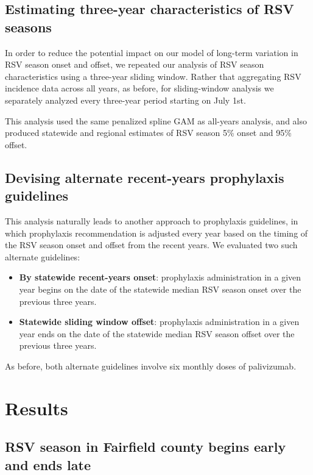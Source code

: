 \documentclass{article}\usepackage[]{graphicx}\usepackage[]{color}
\begin{document}
\begin{multicols}{2}
\subsection{Estimating three-year characteristics of RSV seasons}

In order to reduce the potential impact on our model of long-term variation in RSV season onset and offset, we repeated our analysis of RSV season characteristics using a three-year sliding window. Rather that aggregating RSV incidence data across all years, as before, for sliding-window analysis we separately analyzed every three-year period starting on July 1st.

This analysis used the same penalized spline GAM as all-years analysis, and also produced statewide and regional estimates of RSV season 5\% onset and 95\% offset.

\subsection{Devising alternate recent-years prophylaxis guidelines}

This analysis naturally leads to another approach to prophylaxis guidelines, in which prophylaxis recommendation is adjusted every year based on the timing of the RSV season onset and offset from the recent years. We evaluated two such alternate guidelines:

\begin{itemize}
    \item \textbf{By statewide recent-years onset}: prophylaxis administration in a given year begins on the date of the statewide median RSV season onset over the previous three years. 
    \item \textbf{Statewide sliding window offset}: prophylaxis administration in a given year ends on the date of the statewide median RSV season offset over the previous three years.
\end{itemize}

As before, both alternate guidelines involve six monthly doses of palivizumab. 

\section{Results}

\subsection{RSV season in Fairfield county begins early and ends late}


\end{multicols}
\end{document}
